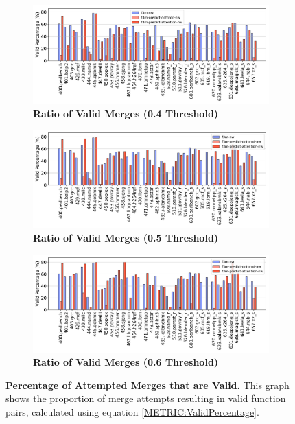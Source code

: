 \begin{figure}[tbh!]
    \centering
    \begin{subfigure}{\textwidth}
        \centering
        \includegraphics[scale=0.47]{Figures/Valid_Merging_Predictions/0.4_ValidPercentage.png}
        \caption{\textbf{Ratio of Valid Merges (\textbf{0.4} Threshold)}} 
        \label{fig:0.4Valid}
    \end{subfigure}
    \begin{subfigure}{\textwidth}
        \centering
        \includegraphics[scale=0.47]{Figures/Valid_Merging_Predictions/0.5_ValidPercentage.png}
        \caption{\textbf{Ratio of Valid Merges (\textbf{0.5} Threshold)}} 
        \label{fig:0.5Valid}
    \end{subfigure}
    \begin{subfigure}{\textwidth}
    \centering
        \includegraphics[scale=0.47]{Figures/Valid_Merging_Predictions/0.6_ValidPercentage.png}
        \caption{\textbf{Ratio of Valid Merges (\textbf{0.6} Threshold)}} 
        \label{fig:0.6Valid}
    \end{subfigure}

    \caption{\textbf{Percentage of Attempted Merges that are Valid.} This graph shows the proportion of merge attempts resulting in valid function pairs, calculated using equation \ref{METRIC:ValidPercentage}.} 
    \label{fig:Valid}
\end{figure}

